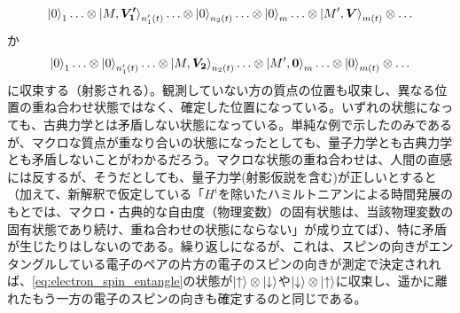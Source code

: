 \begin{equation}
    \ket{0}_1 \ldots \otimes \ket{M,\bm{V_1'}}_{n'_1(t)} \ldots \otimes \ket{0}_{n_2(t)}  \ldots \otimes \ket{0}_m \ldots \otimes \ket{M',\bm{V}}_{m(t)} \otimes\ldots
\end{equation}
か
\begin{equation}
    \ket{0}_1 \ldots \otimes \ket{0}_{n'_1(t)} \ldots \otimes \ket{M,\bm{V_2}}_{n_2(t)}  \ldots \otimes \ket{M',\bm{0}}_m \ldots \otimes \ket{0}_{m(t)} \otimes \ldots 
\end{equation}
に収束する（射影される）。観測していない方の質点の位置も収束し、異なる位置の重ね合わせ状態ではなく、確定した位置になっている。いずれの状態になっても、古典力学とは矛盾しない状態になっている。単純な例で示したのみであるが、マクロな質点が重なり合いの状態になったとしても、量子力学とも古典力学とも矛盾しないことがわかるだろう。マクロな状態の重ね合わせは、人間の直感には反するが、そうだとしても、量子力学(射影仮説を含む)が正しいとすると（加えて、新解釈で仮定している「$H^i$を除いたハミルトニアンによる時間発展のもとでは、マクロ・古典的な自由度（物理変数）の固有状態は、当該物理変数の固有状態であり続け、重ね合わせの状態にならない」が成り立てば）、特に矛盾が生じたりはしないのである。繰り返しになるが、これは、スピンの向きがエンタングルしている電子のペアの片方の電子のスピンの向きが測定で決定されれば、\eqref{eq:electron_spin_entangle}の状態が$\ket{\uparrow} \otimes \ket{\downarrow}$や$\ket{\downarrow} \otimes \ket{\uparrow}$に収束し、遥かに離れたもう一方の電子のスピンの向きも確定するのと同じである。